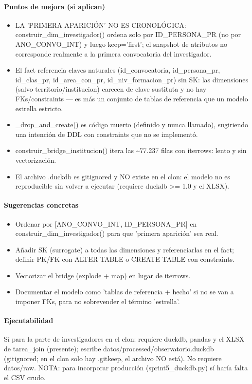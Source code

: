 \paragraph{Puntos de mejora (si aplican)}
\begin{itemize}
  \item LA 'PRIMERA APARICIÓN' NO ES CRONOLÓGICA: construir\_dim\_investigador() ordena solo por ID\_PERSONA\_PR (no por ANO\_CONVO\_INT) y luego keep='first'; el snapshot de atributos no corresponde realmente a la primera convocatoria del investigador.
  \item El fact referencia claves naturales (id\_convocatoria, id\_persona\_pr, id\_clas\_pr, id\_area\_con\_pr, id\_niv\_formacion\_pr) sin SK: las dimensiones (salvo territorio/institucion) carecen de clave sustituta y no hay FKs/constraints --- es más un conjunto de tablas de referencia que un modelo estrella estricto.
  \item \_drop\_and\_create() es código muerto (definido y nunca llamado), sugiriendo una intención de DDL con constraints que no se implementó.
  \item construir\_bridge\_institucion() itera las \textasciitilde{}77.237 filas con iterrows: lento y sin vectorización.
  \item El archivo .duckdb es gitignored y NO existe en el clon: el modelo no es reproducible sin volver a ejecutar (requiere duckdb >= 1.0 y el XLSX).
\end{itemize}

\paragraph{Sugerencias concretas}
\begin{itemize}
  \item Ordenar por [ANO\_CONVO\_INT, ID\_PERSONA\_PR] en construir\_dim\_investigador() para que 'primera aparición' sea real.
  \item Añadir SK (surrogate) a todas las dimensiones y referenciarlas en el fact; definir PK/FK con ALTER TABLE o CREATE TABLE con constraints.
  \item Vectorizar el bridge (explode + map) en lugar de iterrows.
  \item Documentar el modelo como 'tablas de referencia + hecho' si no se van a imponer FKs, para no sobrevender el término 'estrella'.
\end{itemize}

\paragraph{Ejecutabilidad}
Sí para la parte de investigadores en el clon: requiere duckdb, pandas y el XLSX de tarea\_join (presente); escribe datos/processed/observatorio.duckdb (gitignored; en el clon solo hay .gitkeep, el archivo NO está). No requiere datos/raw. NOTA: para incorporar producción (sprint5\_duckdb.py) sí haría falta el CSV crudo.

